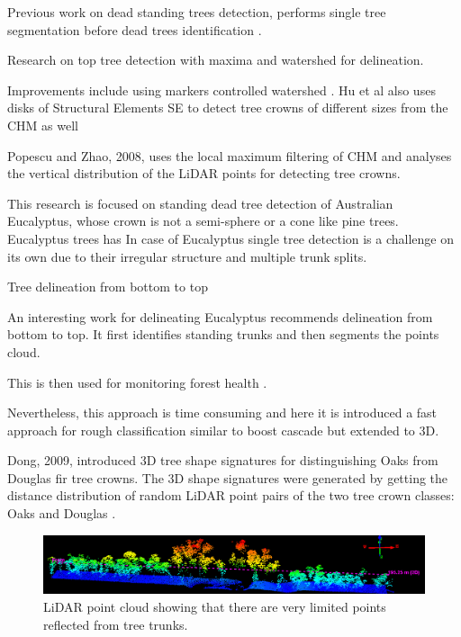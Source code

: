 \documentclass{subfiles}
\begin{document}
\par Previous work on dead standing trees detection, performs single tree segmentation before dead trees identification \cite{Yao2012} \cite{Shendryk2016_DeadTrees}.

Research on top tree detection with maxima and watershed for delineation. \cite{Popescu2003} 

Improvements include using markers controlled watershed \cite{Jing2012}. Hu et al also uses disks of Structural Elements SE to detect tree crowns of different sizes from the CHM as well \cite{Hu2014}


Popescu and Zhao, 2008, uses the local maximum filtering of CHM and analyses the vertical distribution of the LiDAR points for detecting tree crowns.  \cite{Popescu2008}


 \par This research is focused on standing dead tree detection of Australian Eucalyptus, whose crown is not a semi-sphere or a cone like pine trees. Eucalyptus trees has  In case of Eucalyptus single tree detection is a challenge on its own due to their irregular structure and multiple trunk splits. 

Tree delineation from bottom to top \cite{Shendryk2016_treeDeliniation} 



An interesting work for delineating Eucalyptus recommends delineation from bottom to top. It first identifies standing trunks and then segments the points cloud. 

This is then used for monitoring forest health \cite{Shendryk2016_DeadTrees}.



Nevertheless, this approach is time consuming and here it is introduced a fast approach for rough classification similar to boost cascade \cite{Viola2001} but extended to 3D. 

Dong, 2009, introduced 3D tree shape signatures for distinguishing Oaks from Douglas fir tree crowns. The 3D shape signatures were generated by getting the distance distribution of random LiDAR point pairs of the two tree crown classes: Oaks and Douglas \cite{Dong2009}. 

	\begin{figure} [h!]
		\centering
		\includegraphics[width=\textwidth]{img/TreesNoTrunks}
		\caption{LiDAR point cloud showing that there are very limited points reflected from tree trunks.}
		\label{fig:NoTrunks}
	\end{figure}
\end{document}
